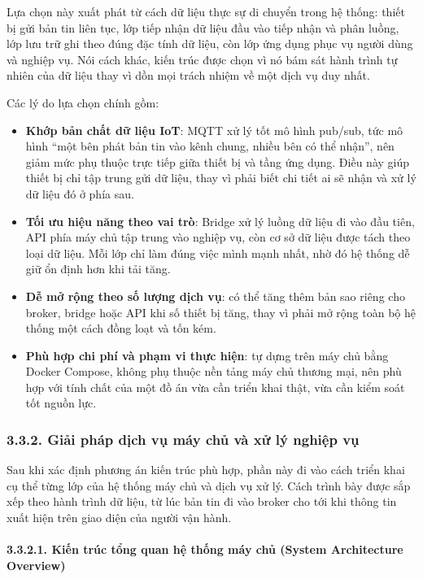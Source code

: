 \documentclass[a4paper]{extarticle}
\providecommand{\tightlist}{%
  \setlength{\itemsep}{0pt}\setlength{\parskip}{0pt}}
\begin{document}
Lựa chọn này xuất phát từ cách dữ liệu thực sự di chuyển trong hệ thống:
thiết bị gửi bản tin liên tục, lớp tiếp nhận dữ liệu đầu vào tiếp nhận
và phân luồng, lớp
lưu trữ ghi theo đúng đặc tính dữ liệu, còn lớp ứng dụng phục vụ người
dùng và nghiệp vụ. Nói cách khác, kiến trúc được chọn vì nó bám sát
hành trình tự nhiên của dữ liệu thay vì dồn mọi trách nhiệm về một dịch
vụ duy nhất.

Các lý do lựa chọn chính gồm:

\begin{itemize}
\tightlist
\item
  \textbf{Khớp bản chất dữ liệu IoT}: MQTT xử lý tốt mô hình pub/sub,
  tức mô hình ``một bên phát bản tin vào kênh chung, nhiều bên có thể
  nhận'', nên giảm mức phụ thuộc trực tiếp giữa thiết bị và tầng ứng
  dụng. Điều này giúp thiết bị chỉ tập trung gửi dữ liệu, thay vì phải
  biết chi tiết ai sẽ nhận và xử lý dữ liệu đó ở phía sau.
\item
  \textbf{Tối ưu hiệu năng theo vai trò}: Bridge xử lý luồng dữ liệu đi
  vào đầu tiên, API phía máy chủ tập trung vào nghiệp vụ, còn cơ sở dữ
  liệu được tách theo loại dữ liệu. Mỗi lớp chỉ làm
  đúng việc mình mạnh nhất, nhờ đó hệ thống dễ giữ ổn định hơn khi tải
  tăng.
\item
  \textbf{Dễ mở rộng theo số lượng dịch vụ}: có thể tăng thêm bản sao
  riêng cho broker, bridge hoặc API khi số thiết bị tăng, thay vì phải mở rộng toàn bộ
  hệ thống một cách đồng loạt và tốn kém.
\item
  \textbf{Phù hợp chi phí và phạm vi thực hiện}: tự dựng trên máy chủ
  bằng Docker Compose, không phụ thuộc nền tảng máy chủ thương mại, nên phù hợp với
  tính chất của một đồ án vừa cần triển khai thật, vừa cần kiểm soát tốt
  nguồn lực.
\end{itemize}

\subsubsection{3.3.2. Giải pháp dịch vụ máy chủ và xử lý
nghiệp vụ}\label{323-giux1ea3i-phuxe1p-backend--cloud}

Sau khi xác định phương án kiến trúc phù hợp, phần này đi vào cách triển
khai cụ thể từng lớp của hệ thống máy chủ và dịch vụ xử lý. Cách trình bày
được sắp xếp theo hành trình dữ liệu, từ lúc bản tin đi vào broker cho tới khi
thông tin xuất hiện trên giao diện của người vận hành.

\paragraph{3.3.2.1. Kiến trúc tổng quan hệ thống máy chủ (System
Architecture
Overview)}\label{3231-kiux1ebfn-truxfac-tux1ed5ng-quan-hux1ec7-thux1ed1ng-cloud-cloud-architecture-overview}
\end{document}
